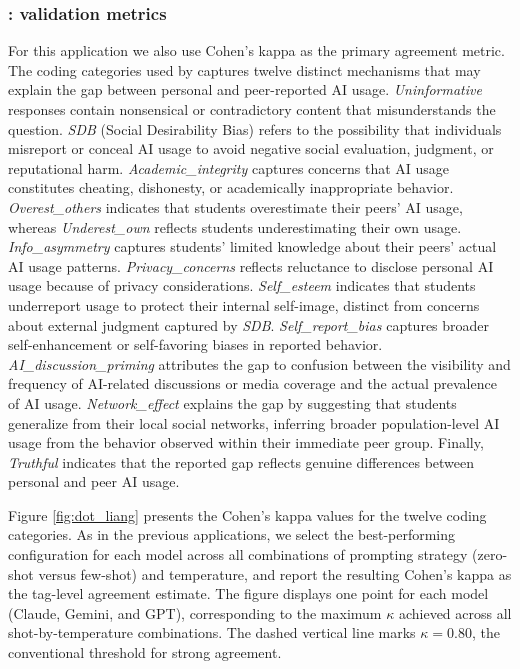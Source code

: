\documentclass[11pt]{article}
\begin{document}
\begin{sloppypar}
\subsubsection{\citet{ling2025underreporting}: validation metrics}

For this application we also use Cohen’s kappa as the primary agreement metric. The coding categories used by \citet{ling2025underreporting} captures twelve distinct mechanisms that may explain the gap between personal and peer-reported AI usage. \textit{Uninformative} responses contain nonsensical or contradictory content that misunderstands the question. \textit{SDB} (Social Desirability Bias) refers to the possibility that individuals misreport or conceal AI usage to avoid negative social evaluation, judgment, or reputational harm. \textit{Academic\_integrity} captures concerns that AI usage constitutes cheating, dishonesty, or academically inappropriate behavior. \textit{Overest\_others} indicates that students overestimate their peers’ AI usage, whereas \textit{Underest\_own} reflects students underestimating their own usage. \textit{Info\_asymmetry} captures students’ limited knowledge about their peers’ actual AI usage patterns. \textit{Privacy\_concerns} reflects reluctance to disclose personal AI usage because of privacy considerations. \textit{Self\_esteem} indicates that students underreport usage to protect their internal self-image, distinct from concerns about external judgment captured by \textit{SDB}. \textit{Self\_report\_bias} captures broader self-enhancement or self-favoring biases in reported behavior.
\textit{AI\_discussion\_priming} attributes the gap to confusion between the visibility and frequency of AI-related discussions or media coverage and the actual prevalence of AI usage. \textit{Network\_effect} explains the gap by suggesting that students generalize from their local social networks, inferring broader population-level AI usage from the behavior observed within their immediate peer group. Finally, \textit{Truthful} indicates that the reported gap reflects genuine differences between personal and peer AI usage.

Figure \ref{fig:dot_liang} presents the Cohen’s kappa values for the twelve coding categories. As in the previous applications, we select the best-performing configuration for each model across all combinations of prompting strategy (zero-shot versus few-shot) and temperature, and report the resulting Cohen’s kappa as the tag-level agreement estimate. The figure displays one point for each model (Claude, Gemini, and GPT), corresponding to the maximum $\kappa$ achieved across all shot-by-temperature combinations. The dashed vertical line marks $\kappa = 0.80$, the conventional threshold for strong agreement.


\end{sloppypar}
\end{document}
